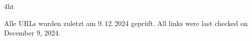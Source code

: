 \documentclass[
    fontsize=12pt, %
    paper=a4,
    twoside, %
    BCOR=3mm, %
    DIV=13,   %
    headinclude=true,
    footinclude=false,
    bibliography=totoc,
    headsepline,
    cleardoublepage=empty,
    parskip=half,
    final   %
]{scrbook}
\begin{document}
%
%

%
%
%






\iftex4ht
\else
\fi


\mainmatter
{}

\renewcommand*{\chapterpagestyle}{scrplain}
\pagestyle{scrheadings}

%
%
%



%
%
%


\printbibliography

\ifdeutsch
Alle URLs wurden zuletzt am 9.\,12.\,2024 geprüft.
\else
All links were last checked on December 9, 2024.
\fi

\end{document}

